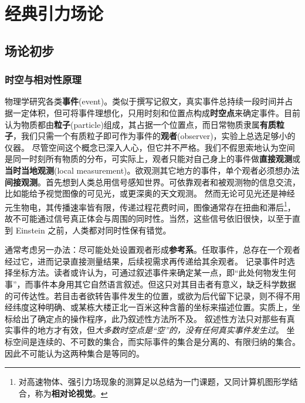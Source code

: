 \chapter{经典引力场论}\label{chpt:GR}
\section{场论初步}
\subsection{时空与相对性原理}

物理学研究各类\textbf{事件}(event)。类似于撰写记叙文，真实事件总持续一段时间并占据一定体积，但可将事件理想化，只用时刻和位置点构成\textbf{时空点}来确定事件。目前认为物质都由\textbf{粒子}(particle)组成，其占据一个位置点，而日常物质隶属\textbf{有质粒子}，我们只需一个有质粒子即可作为事件的\textbf{观者}(observer)，实验上总选足够小的仪器。
尽管空间这个概念已深入人心，但它并不严格。我们不假思索地认为空间是同一时刻所有物质的分布，可实际上，观者只能对自己身上的事件做\textbf{直接观测}或\textbf{当时当地观测}(local measurement)。欲观测其它地方的事件，单个观者必须想办法\textbf{间接观测}。首先想到人类总用信号感知世界。可依靠观者和被观测物的信息交流，比如能给予视觉图像的可见光，或更深奥的天文观测。
然而无论可见光还是神经元生物电，其传播速率皆有限，传递过程花费时间，图像通常存在扭曲和滞后\footnote{对高速物体、强引力场现象的测算足以总结为一门课题，又同计算机图形学结合，称为\textbf{相对论视觉}。}，
故不可能通过信号真正体会与周围的同时性。当然，这些信号依旧很快，以至于直到 Einstein 之前，人类都对同时性保有错觉。

通常考虑另一办法：尽可能处处设置观者形成\textbf{参考系}。任取事件，总存在一个观者经过它，进而记录直接测量结果，后续视需求再传递给其余观者。
记录事件时选择坐标方法。读者或许认为，可通过叙述事件来确定某一点，即“此处何物发生何事”，而事件本身用其它自然语言叙述。但这只对其目击者有意义，缺乏科学数据的可传达性。若目击者欲转告事件发生的位置，或欲为后代留下记录，则不得不用经纬度这种明确、或某栋大楼正北一百米这种含蓄的坐标来描述位置。实质上，坐标给出了确定点的操作程序，此乃叙述性方法所不及。
叙述性方法只对那些有真实事件的地方才有效，但\textit{大多数时空点是“空”的，没有任何真实事件发生过}。
坐标空间是连续的、不可数的集合，而实际事件的集合是分离的、有限归纳的集合。因此不可能认为这两种集合是等同的。

